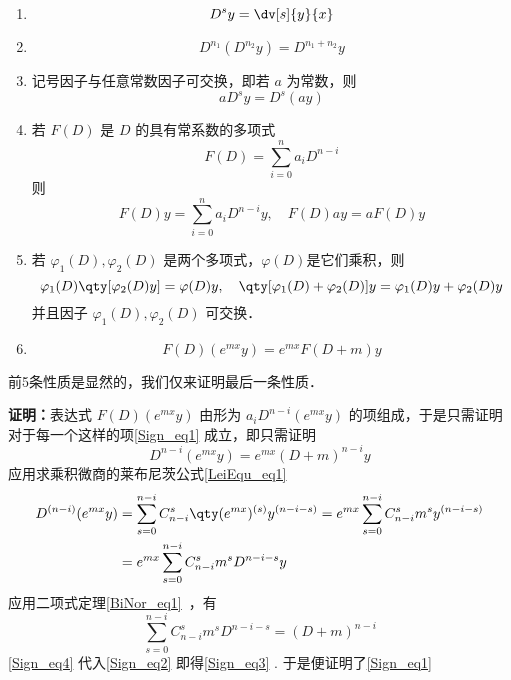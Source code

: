 \begin{enumerate}
\item 
\begin{equation}
D^sy=\dv[s]{y}{x}
\end{equation}
\item 
\begin{equation}
D^{n_1}(D^{n_2}y)=D^{n_1+n_2}y
\end{equation}
\item 记号因子与任意常数因子可交换，即若 $a$ 为常数，则
\begin{equation}
aD^sy=D^s(ay)
\end{equation}
\item 若 $F(D)$ 是 $D$ 的具有常系数的多项式
\begin{equation}
F(D)=\sum_{i=0}^{n}a_iD^{n-i}
\end{equation}
则
\begin{equation}
F(D)y=\sum_{i=0}^{n}a_iD^{n-i}y,\quad F(D)ay=aF(D)y
\end{equation}
\item 若 $\varphi_1(D),\varphi_2(D)$ 是两个多项式，$\varphi(D)$是它们乘积，则
\begin{equation}
\varphi_1(D)\qty[\varphi_2(D)y]=\varphi(D)y,\quad \qty[\varphi_1(D)+\varphi_2(D)]y=\varphi_1(D)y+\varphi_2(D)y
\end{equation}
并且因子 $\varphi_1(D),\varphi_2(D)$ 可交换．
\item \begin{equation}\label{Sign_eq1}
F(D)(e^{mx}y)=e^{mx}F(D+m)y
\end{equation}
\end{enumerate}

前5条性质是显然的，我们仅来证明最后一条性质．

\textbf{证明：}表达式 $F(D)(e^{mx}y)$ 由形为 $a_{i}D^{n-i}(e^{mx}y)$ 的项组成，于是只需证明对于每一个这样的项\autoref{Sign_eq1} 成立，即只需证明
\begin{equation}\label{Sign_eq3}
D^{n-i}(e^{mx}y)=e^{mx}(D+m)^{n-i}y
\end{equation}
应用求乘积微商的莱布尼茨公式\autoref{LeiEqu_eq1}~
\begin{equation}\label{Sign_eq2}
\begin{aligned}
D^{(n-i)}(e^{mx}y)&=\sum_{s=0}^{n-i}C_{n-i}^s\qty(e^{mx})^{(s)}y^{(n-i-s)}=e^{mx}\sum_{s=0}^{n-i}C_{n-i}^sm^sy^{(n-i-s)}\\
&=e^{mx}\sum_{s=0}^{n-i}C_{n-i}^sm^sD^{n-i-s}y
\end{aligned}
\end{equation}
应用二项式定理\autoref{BiNor_eq1}~，有
\begin{equation}\label{Sign_eq4}
\sum_{s=0}^{n-i}C_{n-i}^sm^sD^{n-i-s}=(D+m)^{n-i}
\end{equation}
\autoref{Sign_eq4}  代入\autoref{Sign_eq2} 即得\autoref{Sign_eq3} . 于是便证明了\autoref{Sign_eq1} 




